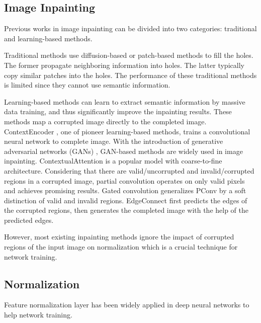 \documentclass[letterpaper]{article} %
\begin{document}
\subsection{Image Inpainting}
Previous works in image inpainting can be divided into two categories: traditional and learning-based methods. 

Traditional methods use diffusion-based \cite{bertalmio2000image,ballester2001filling,esedoglu2002digital,bertalmio2003simultaneous} or patch-based \cite{drori2003fragment,barnes2009patchmatch,xu2010image,darabi2012image} methods to fill the holes. The former propagate neighboring information into holes. The latter typically copy similar patches into the holes. The performance of these traditional methods is limited since they cannot use semantic information.

Learning-based methods can learn to extract semantic information by massive data training, and thus significantly improve the inpainting results. These methods map a corrupted image directly to the completed image. ContextEncoder \cite{pathak2016context}, one of pioneer learning-based methods, trains a convolutional neural network to complete image. With the introduction of generative adversarial networks (GANs) \cite{goodfellow2014generative}, GAN-based methods \cite{yeh2017semantic,iizuka2017globally,yu2018generative,xiong2019foreground,nazeri2019edgeconnect} are widely used in image inpainting. ContextualAttention \cite{yu2018generative} is a popular model with coarse-to-fine architecture. Considering that there are valid/uncorrupted and invalid/corrupted regions in a corrupted image, partial convolution \cite{liu2018image} operates on only valid pixels and achieves promising results. Gated convolution \cite{yu2019free} generalizes PConv by a soft distinction of valid and invalid regions. EdgeConnect \cite{nazeri2019edgeconnect} first predicts the edges of the corrupted regions, then generates the completed image with the help of the predicted edges. 

However, most existing inpainting methods ignore the impact of corrupted regions of the input image on normalization which is a crucial technique for network training.


\subsection{Normalization}
Feature normalization layer has been widely applied in deep neural networks to help network training.
\end{document}
